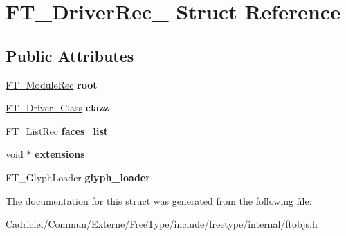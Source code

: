\hypertarget{struct_f_t___driver_rec__}{}\section{F\+T\+\_\+\+Driver\+Rec\+\_\+ Struct Reference}
\label{struct_f_t___driver_rec__}
\subsection*{Public Attributes}
\begin{DoxyCompactItemize}
\item 
\hyperlink{struct_f_t___module_rec__}{F\+T\+\_\+\+Module\+Rec} {\bfseries root}\hypertarget{struct_f_t___driver_rec___a8451ceb25c76794fb47e81f477c8222d}{}\label{struct_f_t___driver_rec___a8451ceb25c76794fb47e81f477c8222d}

\item 
\hyperlink{struct_f_t___driver___class_rec__}{F\+T\+\_\+\+Driver\+\_\+\+Class} {\bfseries clazz}\hypertarget{struct_f_t___driver_rec___a3111153608e5abeb093ed5eb7fef5aec}{}\label{struct_f_t___driver_rec___a3111153608e5abeb093ed5eb7fef5aec}

\item 
\hyperlink{struct_f_t___list_rec__}{F\+T\+\_\+\+List\+Rec} {\bfseries faces\+\_\+list}\hypertarget{struct_f_t___driver_rec___a2602170e3ecde21a764dc32417aaa002}{}\label{struct_f_t___driver_rec___a2602170e3ecde21a764dc32417aaa002}

\item 
void $\ast$ {\bfseries extensions}\hypertarget{struct_f_t___driver_rec___ad2f1c1a800723dc887dcbc7ce78203d8}{}\label{struct_f_t___driver_rec___ad2f1c1a800723dc887dcbc7ce78203d8}

\item 
F\+T\+\_\+\+Glyph\+Loader {\bfseries glyph\+\_\+loader}\hypertarget{struct_f_t___driver_rec___ac28e7adbc14ee82c2b7710d0ee5541e2}{}\label{struct_f_t___driver_rec___ac28e7adbc14ee82c2b7710d0ee5541e2}

\end{DoxyCompactItemize}


The documentation for this struct was generated from the following file\+:\begin{DoxyCompactItemize}
\item 
Cadriciel/\+Commun/\+Externe/\+Free\+Type/include/freetype/internal/ftobjs.\+h\end{DoxyCompactItemize}
